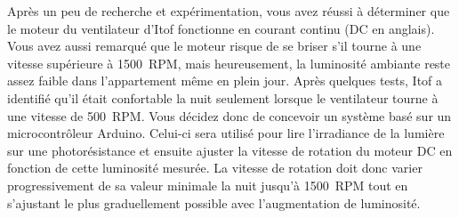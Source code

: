\documentclass[english,french,12pt]{article}
\begin{document}
Après un peu de recherche et expérimentation, vous avez réussi à déterminer que le moteur du ventilateur d’Itof fonctionne en courant continu (DC en anglais). Vous avez aussi remarqué que le moteur risque de se briser s'il tourne à une vitesse supérieure à 1500~RPM, mais heureusement, la luminosité ambiante reste assez faible dans l'appartement même en plein jour. Après quelques tests, Itof a identifié qu’il était confortable la nuit seulement lorsque le ventilateur tourne à une vitesse de 500~RPM. Vous décidez donc de concevoir un système basé sur un microcontrôleur Arduino. Celui-ci sera utilisé pour lire l'irradiance de la lumière sur une photorésistance et ensuite ajuster la vitesse de rotation du moteur DC en fonction de cette luminosité mesurée. La vitesse de rotation doit donc varier progressivement de sa valeur minimale la nuit jusqu'à 1500~RPM tout en s'ajustant le plus graduellement possible avec l'augmentation de luminosité.

\end{document}
